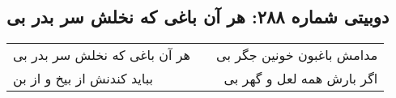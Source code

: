 \begin{center}
\section*{دوبیتی شماره ۲۸۸: هر آن باغی که نخلش سر بدر بی}
\label{sec:288}
\begin{longtable}{l p{0.5cm} r}
هر آن باغی که نخلش سر بدر بی
&&
مدامش باغبون خونین جگر بی
\\
بباید کندنش از بیخ و از بن
&&
اگر بارش همه لعل و گهر بی
\\
\end{longtable}
\end{center}
